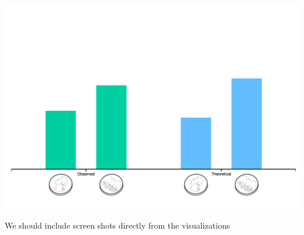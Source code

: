 \documentclass{tufte-book}
\theoremstyle{definition}
\numberwithin{theorem}{section}
\numberwithin{definition}{section}
\numberwithin{lemma}{section}
\numberwithin{corollary}{section}
\numberwithin{proposition}{section}
\numberwithin{remark}{section}
\numberwithin{claim}{section}
\numberwithin{observation}{section}
\numberwithin{fact}{section}
\numberwithin{assumption}{section}
\numberwithin{example}{section}
\numberwithin{exercise}{section}
\begin{document}
\begin{marginfigure}
  \includegraphics{likelihood.png}
  \caption{We should include screen shots directly from the visualizations}
\end{marginfigure}
\end{document}
